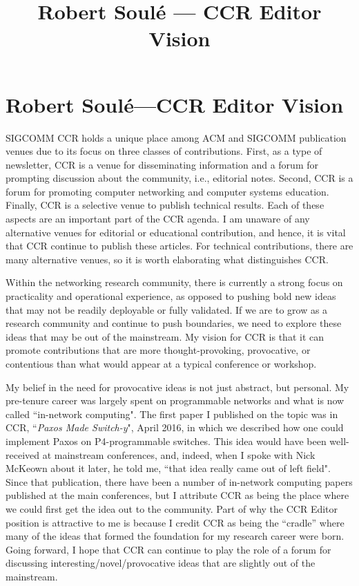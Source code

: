 \documentclass[11pt]{article}
\title{ Robert Soul\'{e} --- CCR Editor Vision}
\author{  }
\date{ }
\begin{document}
\thispagestyle{empty}

\section*{Robert Soul\'{e}---CCR Editor Vision}


SIGCOMM CCR holds a unique place among ACM and SIGCOMM publication venues due to its focus on three classes of contributions. First, as a type of newsletter, CCR is a venue for disseminating information and a forum for prompting discussion about the community, i.e., editorial notes. Second, CCR is a forum for promoting computer networking and computer systems education. Finally, CCR is a selective venue to publish technical results. Each of these aspects are an important part of the CCR agenda. I am unaware of any alternative venues for editorial or educational contribution, and hence, it is vital that CCR continue to publish these articles. For technical contributions, there are many alternative venues, so it is worth elaborating what distinguishes CCR. 

Within the networking research community, there is currently a strong focus on practicality and operational experience, as opposed to pushing bold new ideas that may not be readily deployable or fully validated. If we are to grow as a research community and continue to push boundaries, we need to explore these ideas that may be out of the mainstream. My vision for CCR is that it can promote contributions that are more thought-provoking, provocative, or contentious than what would appear at a typical conference or workshop. 

My belief in the need for provocative ideas is not just abstract, but personal. My pre-tenure career was largely spent on programmable networks and what is now called ``in-network computing". The first paper I published on the topic was in CCR, ``\emph{Paxos Made Switch-y}", April 2016, in which we described how one could implement Paxos on P4-programmable switches. This idea would have been well-received at mainstream conferences, and, indeed, when I spoke with Nick McKeown about it later, he told me, ``that idea really came out of left field". Since that publication, there have been a number of in-network computing papers published at the main conferences, but I attribute CCR as being the place where we could first get the idea out to the community. Part of why the CCR Editor position is attractive to me is because I credit CCR as being the “cradle” where many of the ideas that formed the foundation for my research career were born. Going forward, I hope that CCR can continue to play the role of a forum for discussing interesting/novel/provocative ideas that are slightly out of the mainstream. 
\end{document}

